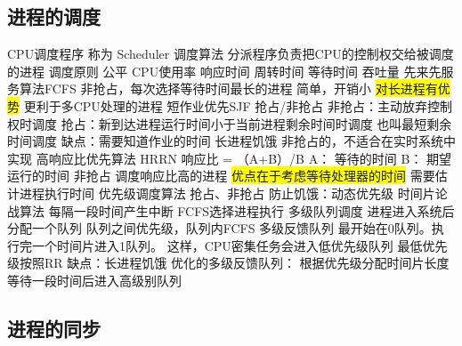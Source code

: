 \documentclass{ctexart}
\newcommand{\hl}[1]{\colorbox{yellow}{#1}}
\begin{document}
\subsection{进程的调度}
\begin{outline}
    \1 CPU调度程序
        \2 称为 Scheduler
        \2 调度算法
        \2 分派程序负责把CPU的控制权交给被调度的进程
    \1 调度原则
        \2 公平
        \2 CPU使用率
        \2 响应时间
        \2 周转时间
        \2 等待时间
        \2 吞吐量
    \1 先来先服务算法FCFS
        \2 非抢占，每次选择等待时间最长的进程
        \2 简单，开销小
        \2 \hl{对长进程有优势}
        \2 更利于多CPU处理的进程
    \1 短作业优先SJF
        \2 抢占/非抢占
        \2 非抢占：主动放弃控制权时调度
        \2 抢占：新到达进程运行时间小于当前进程剩余时间时调度
            \3 也叫最短剩余时间调度
        \2 缺点：需要知道作业的时间
        \2 长进程饥饿
        \2 非抢占的，不适合在实时系统中实现
    \1 高响应比优先算法 HRRN
        \2 响应比 = （A+B）/B
            \3 A： 等待的时间
            \3 B： 期望运行的时间
        \2 非抢占
        \2 调度响应比高的进程
        \2 \hl{优点在于考虑等待处理器的时间}
        \2 需要估计进程执行时间
    \1 优先级调度算法
        \2 抢占、非抢占
        \2 防止饥饿：动态优先级
    \1 时间片论战算法
        \2 每隔一段时间产生中断
        \2 FCFS选择进程执行
    \1 多级队列调度
        \2 进程进入系统后分配一个队列
        \2 队列之间优先级，队列内FCFS
    \1 多级反馈队列
        \2 最开始在0队列。执行完一个时间片进入1队列。
        \2 这样，CPU密集任务会进入低优先级队列
        \2 最低优先级按照RR
        \2 缺点：长进程饥饿
    \1 优化的多级反馈队列：
        \2 根据优先级分配时间片长度
        \2 等待一段时间后进入高级别队列
\end{outline}

\subsection{进程的同步}
\end{document}
